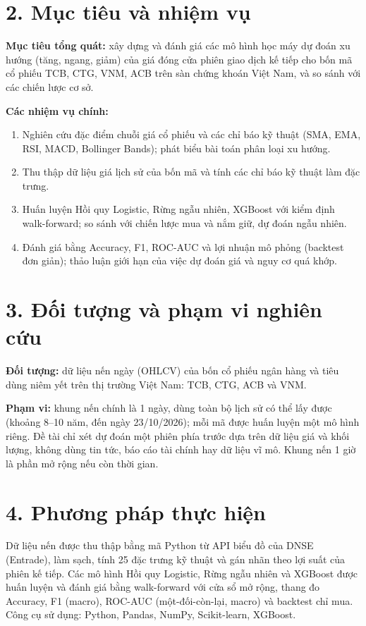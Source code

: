 \documentclass[12pt,a4paper,oneside]{report}
\begin{document}
\section*{2. Mục tiêu và nhiệm vụ}
\textbf{Mục tiêu tổng quát:} xây dựng và đánh giá các mô hình học máy dự đoán
xu hướng (tăng, ngang, giảm) của giá đóng cửa phiên giao dịch kế tiếp cho
bốn mã cổ phiếu TCB, CTG, VNM, ACB trên sàn chứng khoán Việt Nam, và so sánh
với các chiến lược cơ sở.

\textbf{Các nhiệm vụ chính:}
\begin{enumerate}[label=(\arabic*)]
  \item Nghiên cứu đặc điểm chuỗi giá cổ phiếu và các chỉ báo kỹ thuật (SMA,
        EMA, RSI, MACD, Bollinger Bands); phát biểu bài toán phân loại xu hướng.
  \item Thu thập dữ liệu giá lịch sử của bốn mã và tính các chỉ báo kỹ thuật
        làm đặc trưng.
  \item Huấn luyện Hồi quy Logistic, Rừng ngẫu nhiên, XGBoost với kiểm định
        walk-forward; so sánh với chiến lược mua và nắm giữ, dự đoán ngẫu nhiên.
  \item Đánh giá bằng Accuracy, F1, ROC-AUC và lợi nhuận mô phỏng (backtest
        đơn giản); thảo luận giới hạn của việc dự đoán giá và nguy cơ quá khớp.
\end{enumerate}

\section*{3. Đối tượng và phạm vi nghiên cứu}
\textbf{Đối tượng:} dữ liệu nến ngày (OHLCV) của bốn cổ phiếu ngân hàng và
tiêu dùng niêm yết trên thị trường Việt Nam: TCB, CTG, ACB và VNM.

\textbf{Phạm vi:} khung nến chính là 1 ngày, dùng toàn bộ lịch sử có thể lấy
được (khoảng 8--10 năm, đến ngày 23/10/2026); mỗi mã được huấn luyện một mô
hình riêng. Đề tài chỉ xét dự đoán một phiên phía trước dựa trên dữ liệu giá
và khối lượng, không dùng tin tức, báo cáo tài chính hay dữ liệu vĩ mô. Khung
nến 1 giờ là phần mở rộng nếu còn thời gian.

\section*{4. Phương pháp thực hiện}
Dữ liệu nến được thu thập bằng mã Python từ API biểu đồ của DNSE (Entrade),
làm sạch, tính 25 đặc trưng kỹ thuật và gán nhãn theo lợi suất của phiên kế
tiếp. Các mô hình Hồi quy Logistic, Rừng ngẫu nhiên và XGBoost được huấn
luyện và đánh giá bằng walk-forward với cửa sổ mở rộng, thang đo Accuracy,
F1 (macro), ROC-AUC (một-đối-còn-lại, macro) và backtest chỉ mua. Công cụ sử
dụng: Python, Pandas, NumPy, Scikit-learn, XGBoost.
\end{document}
